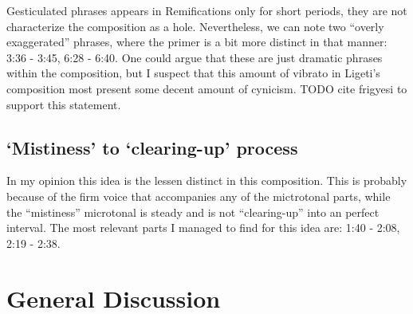 \documentclass[a4paper,11pt]{article}
\begin{document}
Gesticulated phrases appears in Remifications only for short periods, they are not characterize the composition as a hole.
Nevertheless, we can note two ``overly exaggerated'' phrases, where the primer is a bit more distinct in that manner: 3:36 - 3:45, 6:28 - 6:40.
One could argue that these are just dramatic phrases within the composition, but I suspect that this amount of vibrato in Ligeti's composition most present some decent amount of cynicism.
TODO cite frigyesi to support this statement.

\subsection*{‘Mistiness’ to ‘clearing-up’ process}

In my opinion this idea is the lessen distinct in this composition.
This is probably because of the firm voice that accompanies any of the mictrotonal parts, while the ``mistiness'' microtonal is steady and is not ``clearing-up'' into an perfect interval.
The most relevant parts I managed to find for this idea are: 1:40 - 2:08, 2:19 - 2:38.

\section{General Discussion}
\label{sec:general_discussion}

\printbibliography[title={Bibliography}]
\end{document}
